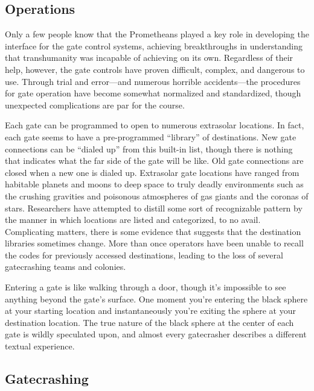 \subsection{Operations}

Only a few people know that the Prometheans played 
a key role in developing the interface for the gate control
systems, achieving breakthroughs in understanding
that transhumanity was incapable of achieving on
its own. Regardless of their help, however, the gate 
controls have proven difficult, complex, and dangerous
to use. Through trial and error—and numerous
horrible accidents—the procedures for gate operation 
have become somewhat normalized and standardized, 
though unexpected complications are par for the 
course.

Each gate can be programmed to open to numerous 
extrasolar locations. In fact, each gate seems to have 
a pre-programmed ``library'' of destinations. New 
gate connections can be ``dialed up'' from this built-in 
list, though there is nothing that indicates what the 
far side of the gate will be like. Old gate connections 
are closed when a new one is dialed up. Extrasolar 
gate locations have ranged from habitable planets 
and moons to deep space to truly deadly environments
such as the crushing gravities and poisonous
atmospheres of gas giants and the coronas of stars. 
Researchers have attempted to distill some sort of recognizable
pattern by the manner in which locations
are listed and categorized, to no avail. Complicating 
matters, there is some evidence that suggests that the 
destination libraries sometimes change. More than 
once operators have been unable to recall the codes 
for previously accessed destinations, leading to the 
loss of several gatecrashing teams and colonies.

Entering a gate is like walking through a door, 
though it's impossible to see anything beyond the 
gate's surface. One moment you're entering the black 
sphere at your starting location and instantaneously 
you're exiting the sphere at your destination location. 
The true nature of the black sphere at the center of 
each gate is wildly speculated upon, and almost every 
gatecrasher describes a different textual experience. 

\subsection{Gatecrashing}


